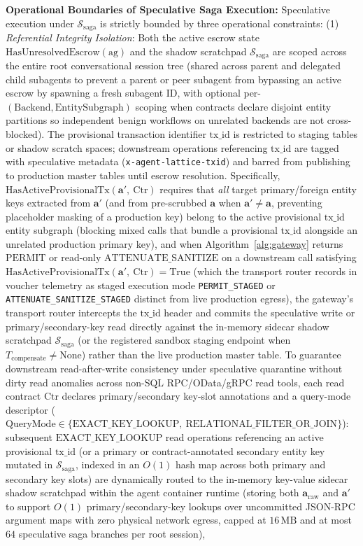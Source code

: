 \documentclass[conference,10pt]{IEEEtran}
\begin{document}
\noindent\textbf{Operational Boundaries of Speculative Saga Execution:} Speculative execution under $\mathcal{S}_{\text{saga}}$ is strictly bounded by three operational constraints: (1) \textit{Referential Integrity Isolation}: Both the active escrow state $\text{HasUnresolvedEscrow}(\text{ag})$ and the shadow scratchpad $\mathcal{S}_{\text{saga}}$ are scoped across the entire root conversational session tree (shared across parent and delegated child subagents to prevent a parent or peer subagent from bypassing an active escrow by spawning a fresh subagent ID, with optional per-$(\text{Backend}, \text{EntitySubgraph})$ scoping when contracts declare disjoint entity partitions so independent benign workflows on unrelated backends are not cross-blocked). The provisional transaction identifier $\text{tx\_id}$ is restricted to staging tables or shadow scratch spaces; downstream operations referencing $\text{tx\_id}$ are tagged with speculative metadata (\texttt{x-agent-lattice-txid}) and barred from publishing to production master tables until escrow resolution. Specifically, $\text{HasActiveProvisionalTx}(\mathbf{a}',\allowbreak\ \text{Ctr})$ requires that \textit{all} target primary/foreign entity keys extracted from $\mathbf{a}'$ (and from pre-scrubbed $\mathbf{a}$ when $\mathbf{a}' \ne \mathbf{a}$, preventing placeholder masking of a production key) belong to the active provisional $\text{tx\_id}$ entity subgraph (blocking mixed calls that bundle a provisional $\text{tx\_id}$ alongside an unrelated production primary key), and when Algorithm~\ref{alg:gateway} returns $\text{PERMIT}$ or read-only $\text{ATTENUATE\_SANITIZE}$ on a downstream call satisfying $\text{HasActiveProvisionalTx}(\mathbf{a}',\allowbreak\ \text{Ctr}) = \text{True}$ (which the transport router records in voucher telemetry as staged execution mode \texttt{PERMIT\_STAGED} or \texttt{ATTENUATE\_SANITIZE\_STAGED} distinct from live production egress), the gateway's transport router intercepts the $\text{tx\_id}$ header and commits the speculative write or primary/secondary-key read directly against the in-memory sidecar shadow scratchpad $\mathcal{S}_{\text{saga}}$ (or the registered sandbox staging endpoint when $T_{\text{compensate}} \ne \text{None}$) rather than the live production master table. To guarantee downstream read-after-write consistency under speculative quarantine without dirty read anomalies across non-SQL RPC/OData/gRPC read tools, each read contract $\text{Ctr}$ declares primary/secondary key-slot annotations and a query-mode descriptor ($\text{QueryMode} \in \{\text{EXACT\_KEY\_LOOKUP},\allowbreak\ \text{RELATIONAL\_FILTER\_OR\_JOIN}\}$): subsequent $\text{EXACT\_KEY\_LOOKUP}$ read operations referencing an active provisional $\text{tx\_id}$ (or a primary or contract-annotated secondary entity key mutated in $\mathcal{S}_{\text{saga}}$, indexed in an $O(1)$ hash map across both primary and secondary key slots) are dynamically routed to the in-memory key-value sidecar shadow scratchpad within the agent container runtime (storing both $\mathbf{a}_{\text{raw}}$ and $\mathbf{a}'$ to support $O(1)$ primary/secondary-key lookups over uncommitted JSON-RPC argument maps with zero physical network egress, capped at $16\,\text{MB}$ and at most $64$ speculative saga branches per root session), 
\end{document}
